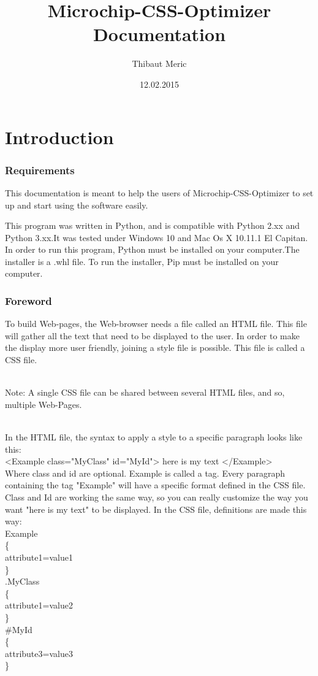 \documentclass[10pt,letterpaper]{article}
\title{\vspace{\fill}Microchip-CSS-Optimizer Documentation}
\author{Thibaut Meric}
\date{12.02.2015\vspace{\fill}}
\begin{document}
\maketitle
\newpage

\part {Introduction}
\setcounter{section}{0}
\section {Requirements}

This documentation is meant to help the users of Microchip-CSS-Optimizer to set up and start using the software easily.

This program was written in Python, and is compatible with Python 2.xx and Python 3.xx.It was tested under Windows 10 and Mac Os X 10.11.1 El Capitan. In order to run this program, Python must be installed on your computer.The installer is a .whl file. To run the installer, Pip must be installed on your computer.

\section {Foreword}

To build Web-pages, the Web-browser  needs a file called an HTML file. This file will gather all the text that need to be displayed to the user. In order to make the display more user friendly, joining a style file is possible. This file is called a CSS file.\\
\begin{itshape}
\\Note: A single CSS file can be shared between several HTML files, and so, multiple Web-Pages.\\
\end{itshape}
\\In the HTML file, the syntax to apply a style to a specific paragraph looks like this:\\

<Example class="MyClass" id="MyId"> here is my text </Example>\\

Where class and id are optional. Example is called a tag. Every paragraph containing the tag "Example" will have a specific format defined in the CSS file. Class and Id are working the same way, so you can really customize the way you want "here is my text" to be displayed. 
In the CSS file, definitions are made this way:
\\Example\\
\{\\
attribute1=value1\\
\}\\
.MyClass\\
\{\\
attribute1=value2\\
\}\\
\#MyId\\
\{\\
attribute3=value3\\
\}\\
\end{document}
